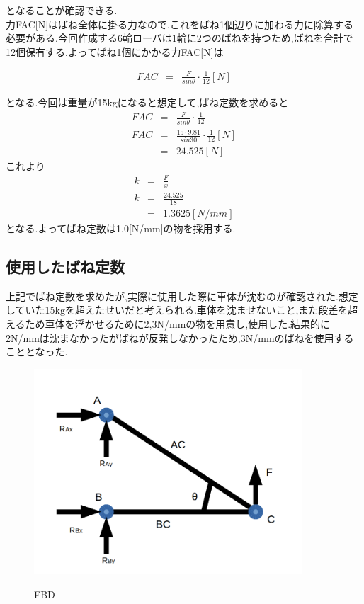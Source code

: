 \documentclass[12pt,oneside]{sotsuken_paper}
\begin{document}
となることが確認できる.　\\ 
力FAC[N]はばね全体に掛る力なので,これをばね1個辺りに加わる力に除算する必要がある.今回作成する6輪ローバは1輪に2つのばねを持つため,ばねを合計で12個保有する.よってばね1個にかかる力FAC[N]は 

\begin{eqnarray} 
	FAC & = & \frac{F}{sinθ}\cdot \frac{1}{12} [N] 
\end{eqnarray} 

となる.今回は重量が15kgになると想定して,ばね定数を求めると 
\begin{eqnarray} 
	FAC & = & \frac{F}{sinθ}\cdot \frac{1}{12} \\ 
	FAC & = & \frac{15 \cdot  9.81}{sin30}\cdot \frac{1}{12} [N] \\ 
	     & =& 24.525[N] 
\end{eqnarray} 
	{これより}　 
\begin{eqnarray} 
	k& = &  \frac{F}{x} \\ 
	k& = &  \frac{24.525}{18} \\ 
	 & = & 1.3625 [N/mm] 
\end{eqnarray} 
となる.よってばね定数は1.0[N/mm]の物を採用する. 
\subsection{使用したばね定数} 
上記でばね定数を求めたが,実際に使用した際に車体が沈むのが確認された.想定していた15kgを超えたせいだと考えられる.車体を沈ませないこと,また段差を超えるため車体を浮かせるために2,3N/mmの物を用意し,使用した.結果的に2N/mmは沈まなかったがばねが反発しなかったため,3N/mmのばねを使用することとなった. 

\begin{figure}[htp] 
 \begin{center} 
  \includegraphics[width=100mm]{img/hard/fig7.png} 
 　\caption{FBD} 
  \label{fig:fbd}%
 \end{center} 
\end{figure} 
\end{document}
